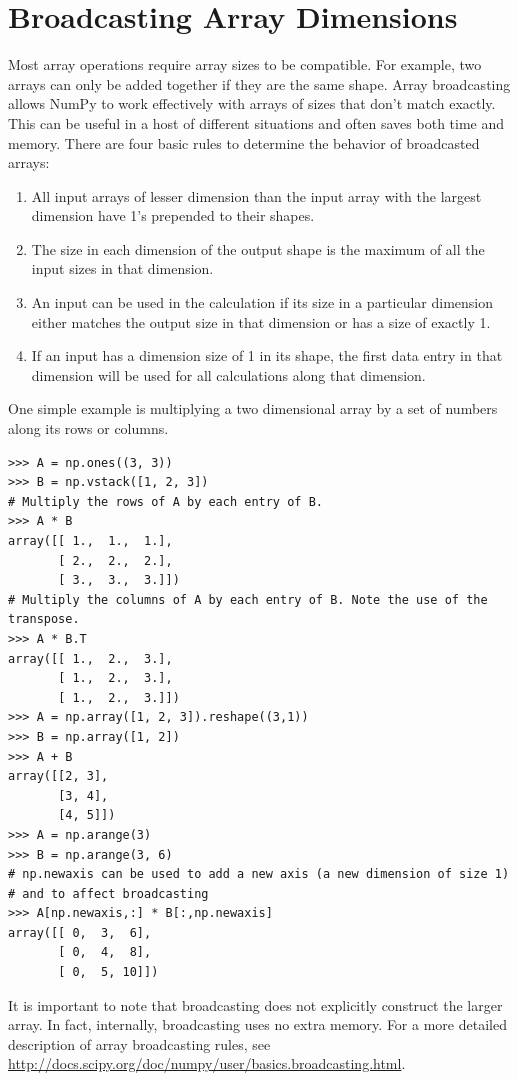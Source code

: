 \section*{Broadcasting Array Dimensions}
Most array operations require array sizes to be compatible.
For example, two arrays can only be added together if they are the same shape.
Array broadcasting allows NumPy to work effectively with arrays of sizes 
that don't match exactly. This can be useful in a host of different 
situations and often saves both time and memory. There are four basic rules 
to determine the behavior of broadcasted arrays:
\begin{enumerate}
\item All input arrays of lesser dimension than the input array with the
largest dimension have 1's prepended to their shapes.
\item The size in each dimension of the output shape is the maximum of all 
the input sizes in that dimension.
\item An input can be used in the calculation if its size in a particular 
dimension either matches the output size in that dimension or has a size 
of exactly 1.
\item If an input has a dimension size of 1 in its shape, the first data 
entry in that dimension will be used for all calculations along that 
dimension.
\end{enumerate}

One simple example is multiplying a two dimensional array by a set of numbers 
along its rows or columns. 

\begin{lstlisting}
>>> A = np.ones((3, 3))
>>> B = np.vstack([1, 2, 3])
# Multiply the rows of A by each entry of B.
>>> A * B
array([[ 1.,  1.,  1.],
       [ 2.,  2.,  2.],
       [ 3.,  3.,  3.]])
# Multiply the columns of A by each entry of B. Note the use of the transpose.
>>> A * B.T 
array([[ 1.,  2.,  3.],
       [ 1.,  2.,  3.],
       [ 1.,  2.,  3.]])
>>> A = np.array([1, 2, 3]).reshape((3,1))
>>> B = np.array([1, 2])
>>> A + B
array([[2, 3],
       [3, 4],
       [4, 5]])
>>> A = np.arange(3)
>>> B = np.arange(3, 6)
# np.newaxis can be used to add a new axis (a new dimension of size 1) 
# and to affect broadcasting
>>> A[np.newaxis,:] * B[:,np.newaxis] 
array([[ 0,  3,  6],
       [ 0,  4,  8],
       [ 0,  5, 10]])
\end{lstlisting}

It is important to note that broadcasting does not explicitly construct the 
larger array. In fact, internally, broadcasting uses no extra memory.
For a more detailed description of array broadcasting rules, see 
\url{http://docs.scipy.org/doc/numpy/user/basics.broadcasting.html}.


